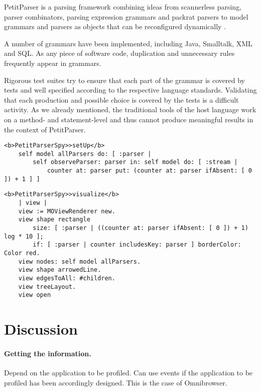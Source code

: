 \documentclass[runningheads]{llncs}
\newcommand{\seclabel}[1]{\label{sec:#1}}
\begin{document}
PetitParser is a parsing framework combining ideas from scannerless parsing, parser combinators, parsing expression grammars and packrat parsers to model grammars and parsers as objects that can be reconfigured dynamically \cite{Reng10c}.

A number of grammars have been implemented, including Java, Smalltalk, XML and SQL. As any piece of software code, duplication and unnecessary rules frequently appear in grammars. 

Rigorous test suites try to ensure that each part of the grammar is covered by tests and well specified according to the respective language standards. Validating that each production and possible choice is covered by the tests is a difficult activity. As we already mentioned, the traditional tools of the host language work on a method- and statement-level and thus cannot produce meaningful results in the context of PetitParser.

\begin{lstlisting}
<b>PetitParserSpy>>setUp</b>
	self model allParsers do: [ :parser |
		self observeParser: parser in: self model do: [ :stream |
			counter at: parser put: (counter at: parser ifAbsent: [ 0 ]) + 1 ] ]
\end{lstlisting}

\begin{lstlisting}
<b>PetitParserSpy>>visualize</b>
	| view |
	view := MOViewRenderer new.
	view shape rectangle 
		size: [ :parser | ((counter at: parser ifAbsent: [ 0 ]) + 1) log * 10 ];
		if: [ :parser | counter includesKey: parser ] borderColor: Color red.
	view nodes: self model allParsers.
	view shape arrowedLine.
	view edgesToAll: #children.
	view treeLayout.
	view open
\end{lstlisting}



\section{Discussion}\seclabel{discussion}

\paragraph{Getting the information.} 
Depend on the application to be profiled. 
Can use events if the application to be profiled has been accordingly designed. This is the case of Omnibrowser. 
\end{document}
